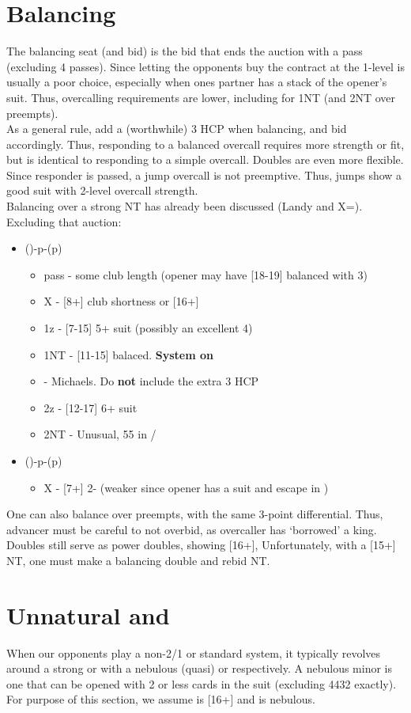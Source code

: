 \documentclass[12pt]{report}
\newcommand{\n}{\\}
\newcommand{\ul}[1]{\begin{itemize}#1\end{itemize}}
\newcommand{\li}{\item[~]}
\newcommand{\bidsection}[2]{\section{\texorpdfstring{#1}{#2}}}
\begin{document}
\section{Balancing} \label{4:7}

    The balancing seat (and bid) is the bid that ends the auction with a pass (excluding 4 passes).  Since letting the opponents buy the contract at the 1-level is usually a poor choice, especially when ones partner has a stack of the opener's suit.  Thus, overcalling requirements are lower, including for 1NT (and 2NT over preempts). \n

    As a general rule, add a (worthwhile) 3 HCP when balancing, and bid accordingly.  Thus, responding to a balanced overcall requires more strength or fit, but is identical to responding to a simple overcall.  Doubles are even more flexible. \n
    
    Since responder is passed, a jump overcall is not preemptive.  Thus, jumps show a good suit with 2-level overcall strength. \n

    Balancing over a strong NT has already been discussed (Landy and X=\cl{}).  Excluding that auction:

    \ul {
        \li ()-p-(p)
        \ul {
            \li pass - some club length (opener may have [18-19] balanced with 3\cl{})
            \li X - [8+] club shortness or [16+]
            \li 1z - [7-15] 5+ suit (possibly an excellent 4)
            \li 1NT - [11-15] balaced.  \textbf{System on}
            \li \cl2 - Michaels.  Do \textbf{not} include the extra 3 HCP
            \li 2z - [12-17] 6+ suit
            \li 2NT - Unusual, 55 in \di{}/\he{}
        }
        \li (\he1)-p-(p)
        \ul {
            \li X - [7+] 2-\he{} (weaker since opener has a suit and escape in \sp1)
        }
    }

    One can also balance over preempts, with the same 3-point differential. Thus, advancer must be careful to not overbid, as overcaller has `borrowed' a king. \n
    
    Doubles still serve as power doubles, showing [16+], Unfortunately, with a [15+] NT, one must make a balancing double and rebid NT.
\newpage

\bidsection{Unnatural  and }{Unnatural 1♣ and 1♢}\label{4:8}

    When our opponents play a non-2/1 or standard system, it typically revolves around a strong  or  with a nebulous (quasi)  or  respectively.  A nebulous minor is one that can be opened with 2 or less cards in the suit (excluding 4432 exactly).  For purpose of this section, we assume  is [16+] and  is nebulous. \n
\end{document}
